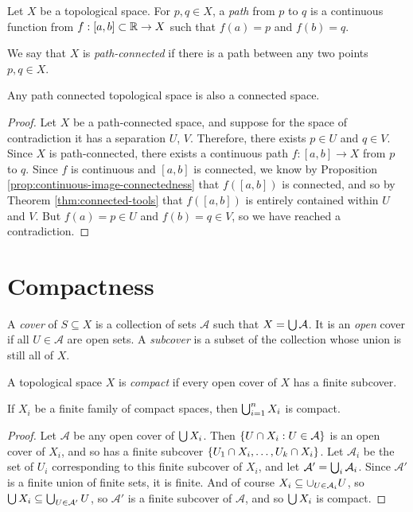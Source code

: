 \begin{defn}
    Let $X$ be a topological space. For $p, q \in X$, a \emph{path} from $p$ to $q$ is a continuous function from $f: [a, b] \subset \mathbb{R} \to X$ such that $f(a) = p$ and $f(b) = q$.

    We say that $X$ is \emph{path-connected} if there is a path between any two points $p, q \in X$.
\end{defn}

\begin{thm}
    Any path connected topological space is also a connected space.
\end{thm}

\begin{proof}
    Let $X$ be a path-connected space, and suppose for the space of contradiction it has a separation $U$, $V$. Therefore, there exists $p\in U$ and $q \in V$. Since $X$ is path-connected, there exists a continuous path $f: [a, b] \to X$ from $p$ to $q$. Since $f$ is continuous and $[a, b]$ is connected, we know by Proposition \ref{prop:continuous-image-connectedness} that $f([a, b])$ is connected, and so by Theorem \ref{thm:connected-tools} that $f([a, b])$ is entirely contained within $U$ and $V$. But $f(a) = p \in U$ and $f(b) = q \in V$, so we have reached a contradiction.
\end{proof}

\section{Compactness}

\begin{defn}
    A \emph{cover} of $S \subseteq X$ is a collection of sets $\mathcal{A}$ such that $X = \bigcup \mathcal{A}$. It is an \emph{open} cover if all $U \in \mathcal{A}$ are open sets. A \emph{subcover} is a subset of the collection whose union is still all of $X$.
\end{defn}

\begin{defn}
    A topological space $X$ is \emph{compact} if every open cover of $X$ has a finite subcover.
\end{defn}

\begin{prop}
    If $X_{i}$ be a finite family of compact spaces, then $\bigcup_{i=1}^{n}X_i$ is compact.
\end{prop}

\begin{proof}
    Let $\mathcal{A}$ be any open cover of $\bigcup X_i$. Then $\{ U \cap X_i : U \in \mathcal{A} \}$ is an open cover of $X_i$, and so has a finite subcover $\{U_1 \cap X_i, \ldots, U_k \cap X_i\}$. Let $\mathcal{A}_i$ be the set of $U_i$ corresponding to this finite subcover of $X_i$, and let $\mathcal{A}' = \bigcup_{i} \mathcal{A}_i$. Since $\mathcal{A}'$ is a finite union of finite sets, it is finite. And of course $X_i \subseteq \cup_{U \in \mathcal{A}_i}U$, so $\bigcup X_i \subseteq \bigcup_{U \in \mathcal{A}'}U$, so $\mathcal{A}'$ is a finite subcover of $\mathcal{A}$, and so $\bigcup X_i$ is compact.
\end{proof}

